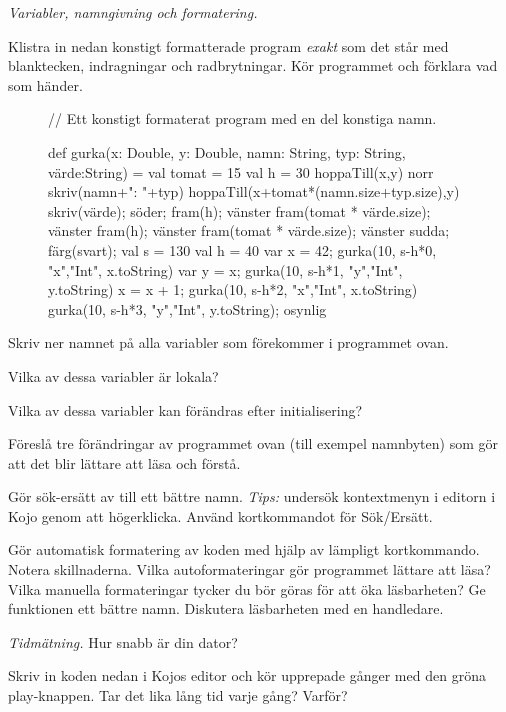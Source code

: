 \Task \emph{Variabler, namngivning och formatering.}

\Subtask Klistra in nedan konstigt formatterade program \emph{exakt} som det står med blanktecken, indragningar och radbrytningar. Kör programmet och förklara vad som händer.

\begin{figure}
\begin{Code}
// Ett konstigt formaterat program med en del konstiga namn.

def gurka(x: Double,
y: Double, namn: String,
typ: String,
värde:String) = {
val tomat = 15
val h = 30
hoppaTill(x,y)
norr
skriv(namn+": "+typ)
hoppaTill(x+tomat*(namn.size+typ.size),y)
skriv(värde); söder; fram(h); vänster
fram(tomat * värde.size); vänster
fram(h); vänster
fram(tomat * värde.size); vänster }
sudda; färg(svart); val s = 130
val h = 40
var x = 42; gurka(10, s-h*0, "x","Int", x.toString)
var y = x; gurka(10, s-h*1, "y","Int", y.toString)
x = x + 1; gurka(10, s-h*2, "x","Int", x.toString)
gurka(10, s-h*3, "y","Int", y.toString); osynlig
\end{Code}
\end{figure}

\Subtask\Pen Skriv ner namnet på alla variabler som förekommer i programmet ovan.

\Subtask\Pen Vilka av dessa variabler är lokala?

\Subtask\Pen Vilka av dessa variabler kan förändras efter initialisering?

\Subtask\Pen Föreslå tre förändringar av programmet ovan (till exempel namnbyten) som gör att det blir lättare att läsa och förstå.

\Subtask Gör sök-ersätt av  till ett bättre namn. \emph{Tips:} undersök kontextmenyn i editorn i Kojo genom att högerklicka. Använd kortkommandot för Sök/Ersätt.

\Subtask Gör automatisk formatering av koden med hjälp av lämpligt kortkommando. Notera skillnaderna. Vilka autoformateringar gör programmet lättare att läsa? Vilka manuella formateringar tycker du bör göras för att öka läsbarheten? Ge funktionen  ett bättre namn.  Diskutera läsbarheten med en handledare.



\Task \label{task:measuretime} \emph{Tidmätning.} Hur snabb är din dator?

\Subtask \label{task:timer} Skriv in koden nedan i Kojos editor och kör upprepade gånger med den gröna play-knappen. Tar det lika lång tid varje gång? Varför?

